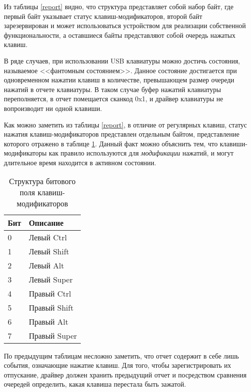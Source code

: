 Из таблицы \ref{report} видно, что структура представляет собой набор байт, 
где первый байт указывает статус клавиш-модификаторов,
второй байт зарезервирован и может использоваться устройством для реализации собственной функциональности,
а оставшиеся байты представляют собой очередь нажатых клавиш.

В ряде случаев, при использовании USB клавиатуры можно достичь состояния, называемое <<фантомным состоянием>>.
Данное состояние достигается при одновременном нажатии клавиш в количестве, превышающем размер очереди нажатий
в отчете клавиатуры. В таком случае буфер нажатий клавиатуры переполняется, в отчет помещается сканкод 0x1,
и драйвер клавиатуры не вопроизводит ни одной клавиши.

Как можно заметить из таблицы \ref{report}, в отличие от регулярных клавиш, статус нажатия клавиш-модификаторов
представлен отдельным байтом, представление которого отражено в таблице \ref{modkeys}.
Данный факт можно объяснить тем, что клавиши-модификаторы как правило используются для \emph{модификации}
нажатий, и могут длительное время находится в активном состоянии.

\begin{table}[H] 
    \caption{Структура битового поля клавиш-модификаторов}
    \begin{tabular}{| m{2cm} | m{8cm} |}
        \hline
        Бит     &  Описание     \\
        \hline
        0       &  Левый Ctrl   \\
        \hline
        1       &  Левый Shift  \\
        \hline
        2       &  Левый Alt    \\
        \hline
        3       &  Левый Super  \\
        \hline
        4       &  Правый Ctrl  \\
        \hline
        5       &  Правый Shift \\
        \hline
        6       &  Правый Alt   \\
        \hline
        7       &  Правый Super \\
        \hline
    \end{tabular}
    \label{modkeys}
\end{table}

По предыдущим таблицам несложно заметить, что отчет содержит в себе лишь события, означающие
нажатие клавиш. Для того, чтобы зарегистрировать их отпускание, драйвер должен хранить предыдущий
отчет и посредством сравнения очередей определить, какая клавиша перестала быть зажатой.

